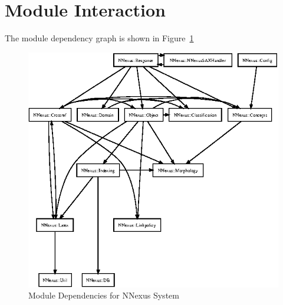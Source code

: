 \documentclass{article}
\begin{document}
\section{Module Interaction}
The module dependency graph is shown in Figure~\ref{Modules}
\begin{figure}[ht]
\centerline{\includegraphics[width=5.5in]{figures/NNexusModuleDep}}
\caption{Module Dependencies for NNexus System}
\label{Modules}
\end{figure}
\end{document}
